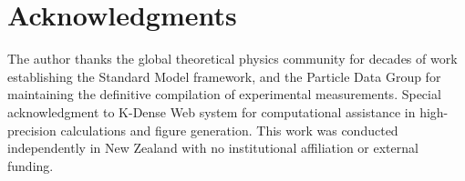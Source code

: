 \documentclass[11pt,a4paper]{article}
\begin{document}


\section*{Acknowledgments}
The author thanks the global theoretical physics community for decades of work establishing the Standard Model framework, and the Particle Data Group for maintaining the definitive compilation of experimental measurements. Special acknowledgment to K-Dense Web system for computational assistance in high-precision calculations and figure generation. This work was conducted independently in New Zealand with no institutional affiliation or external funding.



\end{document}
